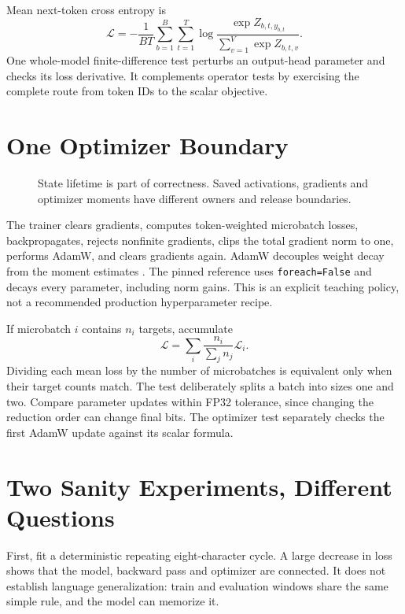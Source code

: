 Mean next-token cross entropy is
\[
 \mathcal L=-\frac{1}{BT}\sum_{b=1}^{B}\sum_{t=1}^{T}
 \log\frac{\exp Z_{b,t,y_{b,t}}}{\sum_{v=1}^{V}\exp Z_{b,t,v}}.
\]
One whole-model finite-difference test perturbs an output-head parameter and
checks its loss derivative. It complements operator tests by exercising the
complete route from token IDs to the scalar objective.

\section{One Optimizer Boundary}

\begin{figure}[htbp]\centering

\caption{State lifetime is part of correctness. Saved activations, gradients
and optimizer moments have different owners and release boundaries.}
\label{fig:step-lifetime}
\end{figure}

The trainer clears gradients, computes token-weighted microbatch losses,
backpropagates, rejects nonfinite gradients, clips the total gradient norm to
one, performs AdamW, and clears gradients again. AdamW decouples weight decay
from the moment estimates \cite{loshchilov2019adamw}. The pinned reference uses
\texttt{foreach=False} and decays every parameter, including norm gains. This
is an explicit teaching policy, not a recommended production hyperparameter recipe.

If microbatch \(i\) contains \(n_i\) targets, accumulate
\[
 \mathcal L=\sum_i \frac{n_i}{\sum_j n_j}\mathcal L_i.
\]
Dividing each mean loss by the number of microbatches is equivalent only when
their target counts match. The test deliberately splits a batch into sizes one
and two. Compare parameter updates within FP32 tolerance, since changing the
reduction order can change final bits. The optimizer test separately checks
the first AdamW update against its scalar formula.

\section{Two Sanity Experiments, Different Questions}

First, fit a deterministic repeating eight-character cycle. A large decrease
in loss shows that the model, backward pass and optimizer are connected. It
does not establish language generalization: train and evaluation windows share
the same simple rule, and the model can memorize it.


